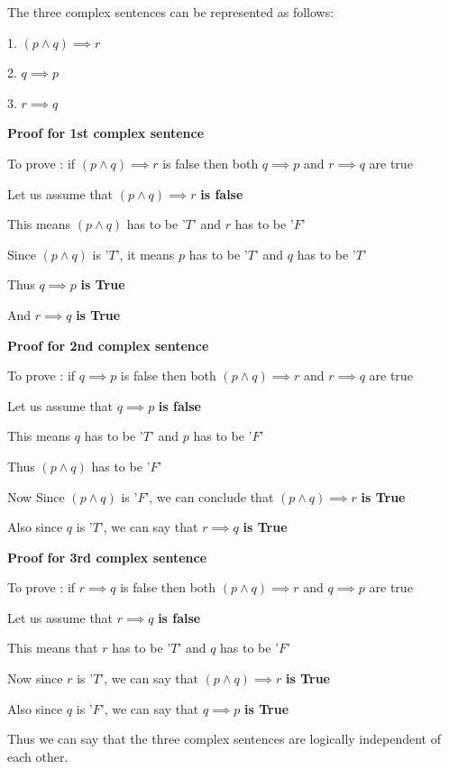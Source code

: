 \documentclass{article}
\begin{document}
\begin{enumerate}
  \begin{answer}
  The three complex sentences can be represented as follows:
  
  1. $(p \land q) \implies r$
  
  2. $q \implies p$
  
  3. $ r \implies q$
  
 \textbf{Proof for 1st complex sentence}
  
  To prove : if  $(p \land q) \implies r$ is false then both $q \implies p$ and $ r \implies q$ are true
  
  Let us assume that  $(p \land q) \implies r$ \textbf{is false}
  
  This means $(p \land q)$ has to be '$T$'  and $r$ has to be '$F$'  
  
  Since $(p \land q)$ is '$T$', it means $p$ has to be '$T$' and $q$ has to be '$T$'
  
  Thus $q \implies p$  \textbf{is True}
  
  And $ r \implies q$  \textbf{is True}
  
   \textbf{Proof for 2nd complex sentence}
   
   To prove : if  $q \implies p$  is false then both $(p \land q) \implies r$ and $ r \implies q$ are true
   
   Let us assume that $q \implies p$ \textbf{is false}
   
   This means  $q$ has to be '$T$'  and $p$ has to be '$F$'  
   
   Thus  $(p \land q)$ has to be '$F$'
   
   Now Since $(p \land q)$ is '$F$', we can conclude that $(p \land q) \implies r$ \textbf{is True}
   
 Also since $q$ is '$T$', we can say that $ r \implies q$  \textbf{is True}
 
  \textbf{Proof for 3rd complex sentence}
  
   To prove : if  $ r \implies q$  is false then both $(p \land q) \implies r$ and $q \implies p$ are true
  
   Let us assume that $ r \implies q$ \textbf{is false}
   
   This means that $r$ has to be '$T$' and $q$ has to be '$F$'
   
   Now since $r$ is '$T$', we can say that  $(p \land q) \implies r$ \textbf{is True}
   
   Also since $q$ is '$F$', we can say that $q \implies p$  \textbf{is True}
  
  Thus we can say that the three complex sentences are logically independent of each other.
  

\end{answer}
\end{enumerate}
\end{document}

